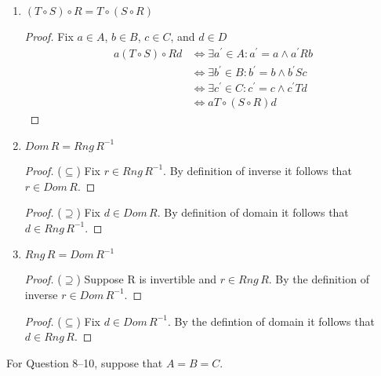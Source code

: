 \documentclass{article}
\begin{document}
\begin{enumerate}
    \item $(T \circ S) \circ R = T \circ (S \circ R)$
      \begin{proof}
        Fix $a\in A$, $b\in B$, $c\in C$, and $d\in D$
        \begin{align*}
          a(T\circ S)\circ Rd &\iff \exists a^{'}\in A: a^{'}=a \wedge a^{'}Rb \\
          &\iff \exists b^{'}\in B: b^{'}=b \wedge b^{'}Sc \\
          &\iff \exists c^{'}\in C: c^{'}=c \wedge c^{'}Td \\
          &\iff aT\circ(S\circ R)d
        \end{align*}
      \end{proof}
    \item $Dom\,R = Rng\,R^{-1}$
      \begin{proof} ($\subseteq$)
        Fix $r\in Rng\,R^{-1}$. By definition of inverse it follows that $r\in Dom\,R$.
      \end{proof}
      \begin{proof} ($\supseteq$)
Fix $d\in Dom\,R$. By definition of domain it follows that $d \in Rng\,R^{-1}$.
      \end{proof}
    \item $Rng\,R = Dom\,R^{-1}$
      \begin{proof} ($\supseteq$)
        Suppose R is invertible and $r\in Rng\,R$. By the definition of inverse $r\in Dom\,R^{-1}$.
      \end{proof}
      \begin{proof} ($\subseteq$)
Fix $d\in Dom\,R^{-1}$. By the defintion of domain it follows that $d\in Rng\,R$.
      \end{proof}
  \end{enumerate}
  For Question 8–10, suppose that $A = B = C$.
\end{document}
